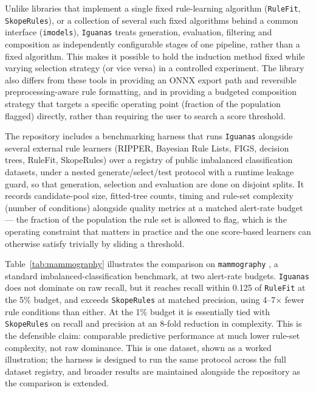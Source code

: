 \documentclass[twoside,11pt]{article}
\begin{document}
Unlike libraries that implement a single fixed rule-learning algorithm
(\texttt{RuleFit}, \texttt{SkopeRules}), or a collection of several such fixed
algorithms behind a common interface (\texttt{imodels}), \texttt{Iguanas}
treats generation, evaluation, filtering and composition as independently
configurable stages of one pipeline, rather than a fixed algorithm. This
makes it possible to hold the induction method fixed while varying selection
strategy (or vice versa) in a controlled experiment. The library also differs
from these tools in providing an
ONNX export path and reversible preprocessing-aware rule formatting, and in
providing a budgeted composition strategy that targets a specific
operating point (fraction of the population flagged) directly, rather than
requiring the user to search a score threshold.

The repository includes a benchmarking harness that runs \texttt{Iguanas}
alongside several external rule learners (RIPPER, Bayesian Rule Lists, FIGS,
decision trees, RuleFit, SkopeRules) over a registry of public imbalanced
classification datasets, under a nested generate/select/test protocol with a
runtime leakage guard, so that generation, selection and evaluation are done
on disjoint splits. It records candidate-pool size, fitted-tree counts,
timing and rule-set complexity (number of conditions) alongside quality
metrics at a matched alert-rate budget --- the fraction of the population the
rule set is allowed to flag, which is the operating constraint that matters
in practice and the one score-based learners can otherwise satisfy trivially
by sliding a threshold.

Table~\ref{tab:mammography} illustrates the comparison on \texttt{mammography}
\citep{mammography}, a standard imbalanced-classification benchmark, at two
alert-rate budgets. \texttt{Iguanas} does not dominate on raw recall, but it
reaches recall within 0.125 of \texttt{RuleFit} at the 5\% budget, and
exceeds \texttt{SkopeRules} at matched precision, using 4--7$\times$ fewer
rule conditions than either. At the 1\% budget it is essentially tied
with \texttt{SkopeRules} on recall and precision at an 8-fold reduction in
complexity. This is the defensible claim: comparable predictive performance
at much lower rule-set complexity, not raw dominance. This is one dataset,
shown as a worked illustration; the harness is designed to run the same
protocol across the full dataset registry, and broader results are
maintained alongside the repository as the comparison is extended.
\end{document}
